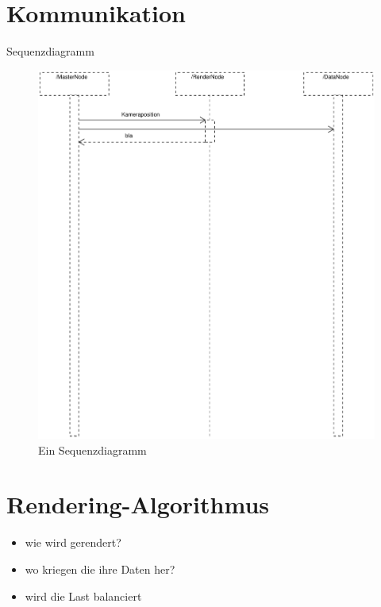 \section{Kommunikation}
\label{sec:impl:kommunikation}
Sequenzdiagramm
\begin{figure}
 \centering
  \includegraphics[scale=0.5]{images/Sequenzdiagramm.pdf}
  \caption{Ein Sequenzdiagramm}
 \label{fig:impl:seqdiag}
\end{figure}

\begin{center}
\end{center}

\section{Rendering-Algorithmus}
\label{sec:impl:renderalgo}
\begin{itemize}
 \item wie wird gerendert?
 \item wo kriegen die ihre Daten her?
 \item wird die Last balanciert
\end{itemize}


%
%
